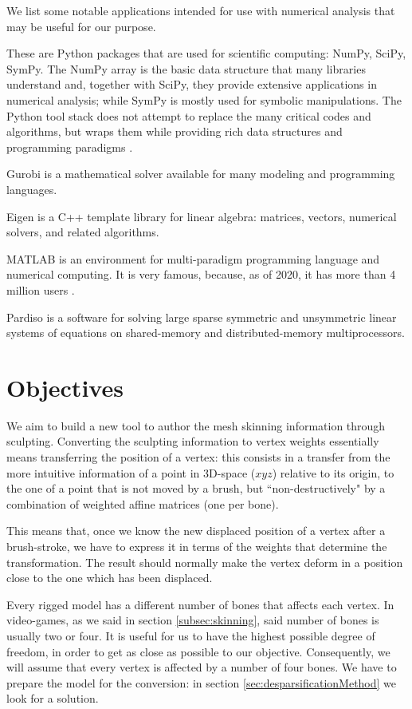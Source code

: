 \documentclass[12pt,twoside]{report}
\begin{document}
We list some notable applications intended for use with numerical analysis that may be useful for our purpose.

These are Python packages that are used for scientific computing: NumPy, SciPy, SymPy. The NumPy array is the basic data structure that many libraries understand and, together with SciPy, they provide extensive applications in numerical analysis; while SymPy is mostly used for symbolic manipulations. The Python tool stack does not attempt to replace the many critical codes and algorithms, but wraps them while providing rich data structures and programming paradigms \cite{perez2010python}.

Gurobi is a mathematical solver available for many modeling and programming languages.

Eigen is a C++ template library for linear algebra: matrices, vectors, numerical solvers, and related algorithms.

MATLAB is an environment for multi-paradigm programming language and numerical computing. It is very famous, because, as of 2020, it has more than 4 million users \cite{companyOverviewMathlab}.

Pardiso is a software for solving large sparse symmetric and unsymmetric linear systems of equations on shared-memory and distributed-memory multiprocessors.

\chapter{Objectives}
\label{ch:objectives}
We aim to build a new tool to author the mesh skinning information through sculpting. Converting the sculpting information to vertex weights essentially means transferring the position of a vertex: this consists in a transfer from the more intuitive information of a point in 3D-space ($xyz$) relative to its origin, to the one of a point that is not moved by a brush, but ``non-destructively" by a combination of weighted affine matrices (one per bone).

This means that, once we know the new displaced position of a vertex after a brush-stroke, we have to express it in terms of the weights that determine the transformation. The result should normally make the vertex deform in a position close to the one which has been displaced.

Every rigged model has a different number of bones that affects each vertex. In video-games, as we said in section \ref{subsec:skinning}, said number of bones is usually two or four. It is useful for us to have the highest possible degree of freedom, in order to get as close as possible to our objective. Consequently, we will assume that every vertex is affected by a number of four bones. We have to prepare the model for the conversion: in section \ref{sec:desparsificationMethod} we look for a solution.
\end{document}
